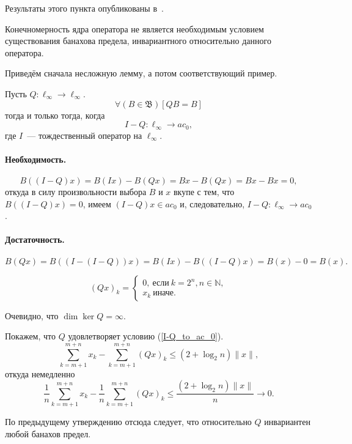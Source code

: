 Результаты этого пункта опубликованы в~\cite{our-ped-2018-inf-dim-ker}.


Конечномерность ядра оператора не является необходимым условием существования
банахова предела, инвариантного относительно данного оператора.

Приведём сначала несложную лемму, а потом соответствующий пример.

\begin{lemma}

	Пусть $Q:\ell_\infty \to \ell_\infty$.
	\begin{equation}
		\forall(B\in\mathfrak{B})[QB = B]
	\end{equation}
	тогда и только тогда, когда
	\begin{equation}\label{I-Q_to_ac_0}
		I-Q : \ell_\infty \to ac_0,
	\end{equation}
	где $I$~--- тождественный оператор на $\ell_\infty$.

\end{lemma}

\paragraph{Необходимость.}
\begin{equation}
	B((I-Q)x) =
	B(Ix) - B(Qx) =
	Bx - B(Qx)=
	Bx-Bx
	=
	0
	,
\end{equation}
откуда в силу произвольности выбора $B$ и $x$ вкупе с тем, что $B((I-Q)x)=0$,
имеем $(I-Q)x \in ac_0$ и, следовательно, $I-Q : \ell_\infty \to ac_0$.

\paragraph{Достаточность.}
\begin{equation}
	B(Qx) = B((I-(I-Q))x) =
	B(Ix)-B((I-Q)x) =
	B(x) - 0 = B(x).
\end{equation}


\begin{example}
	\begin{equation}
		(Qx)_k =
		\begin{cases}
			0,~\mbox{если}~ k = 2^n, n \in\mathbb{N},
			\\
			x_k~\mbox{иначе.}
		\end{cases}
	\end{equation}
\end{example}
Очевидно, что $\dim \ker Q = \infty$.

Покажем, что $Q$ удовлетворяет условию (\ref{I-Q_to_ac_0}).
\begin{equation}
	\sum_{k=m+1}^{m+n} x_k - \sum_{k=m+1}^{m+n} (Qx)_k \leqslant (2 + \log_2 n) \|x\|,
\end{equation}
откуда немедленно
\begin{equation}
	\frac{1}{n}\sum_{k=m+1}^{m+n} x_k - \frac{1}{n}\sum_{k=m+1}^{m+n} (Qx)_k \leqslant \frac{(2 + \log_2 n) \|x\|}{n} \to 0.
\end{equation}

По предыдущему утверждению отсюда следует, что относительно $Q$ инвариантен любой банахов предел.
